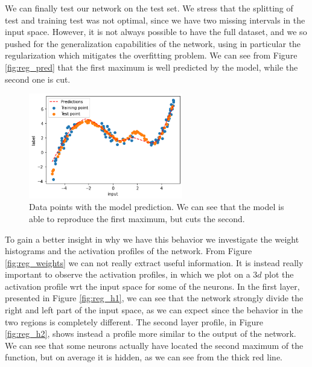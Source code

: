 We can finally test our network on the test set. We stress that the splitting of test and training test was not optimal, 
since we have two missing intervals in the input space. However, it is not always possible to have the full dataset, and
we so pushed for the generalization capabilities of the network, using in particular the regularization which mitigates the 
overfitting problem. 
We can see from Figure \ref{fig:reg_pred} that the first maximum is well predicted by the model, while the second one is cut.
\begin{figure}[h]
    \centering
    \includegraphics[width=0.6\textwidth]{Images/regression_pred.png}
    \caption{Data points with the model prediction. We can see that the model is able to reproduce the first maximum, but cuts the 
        second.}
    \label{tab:reg_pred}
\end{figure}
To gain a better insight in why we have this behavior we investigate the weight histograms and the activation profiles
of the network.
From Figure \ref{fig:reg_weights} we can not really extract useful information.
It is instead really important to observe the activation profiles, in which we plot on a $3d$ plot the activation profile
wrt the input space for some of the neurons. In the first layer, presented in Figure \ref{fig:reg_h1}, we can see that the network strongly divide the right and left
part of the input space, as we can expect since the behavior in the two regions is completely different. The second layer 
profile, in Figure \ref{fig:reg_h2}, shows instead a profile more similar to the output of the network. We can see that some neurons actually have located the second maximum of the 
function, but on average it is hidden, as we can see from the thick red line.
